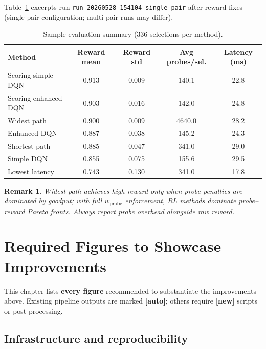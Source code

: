 \documentclass[11pt,a4paper,twoside,openright]{report}
\newtheorem{remark}{Remark}[chapter]
\begin{document}
Table~\ref{tab:sample-run} excerpts run \texttt{run\_20260528\_154104\_single\_pair}
after reward fixes (single-pair configuration; multi-pair runs may differ).

\begin{table}[htbp]
\centering
\caption{Sample evaluation summary (336 selections per method).}
\label{tab:sample-run}
\begin{tabular}{lcccc}
\toprule
Method & Reward mean & Reward std & Avg probes/sel. & Latency (ms) \\
\midrule
Scoring simple DQN & 0.913 & 0.009 & 140.1 & 22.8 \\
Scoring enhanced DQN & 0.903 & 0.016 & 142.0 & 24.8 \\
Widest path & 0.900 & 0.009 & 4640.0 & 28.2 \\
Enhanced DQN & 0.887 & 0.038 & 145.2 & 24.3 \\
Shortest path & 0.885 & 0.047 & 341.0 & 29.0 \\
Simple DQN & 0.855 & 0.075 & 155.6 & 29.5 \\
Lowest latency & 0.743 & 0.130 & 341.0 & 17.8 \\
\bottomrule
\end{tabular}
\end{table}

\begin{remark}
Widest-path achieves high reward only when probe penalties are dominated by
goodput; with full $w_{\mathrm{probe}}$ enforcement, RL methods dominate
\emph{probe--reward Pareto} fronts. Always report probe overhead alongside raw reward.
\end{remark}

\chapter{Required Figures to Showcase Improvements}

This chapter lists \textbf{every figure} recommended to substantiate the improvements
above. Existing pipeline outputs are marked \textbf{[auto]}; others require
\textbf{[new]} scripts or post-processing.

\section{Infrastructure and reproducibility}
\end{document}
